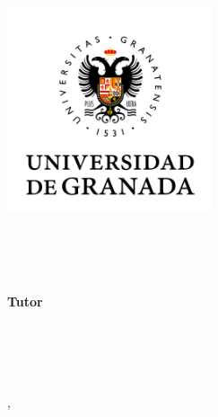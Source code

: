 \begin{titlepage}
    \begin{addmargin}[-3.45cm]{-3cm}
    \begin{center}
        \large  

        \hfill

        \includegraphics[width=6cm]{images/ugrmarca} \\ \medskip

        \vfill

        \begingroup
            \color{TealBlue}\spacedallcaps{\myTitle} \\ \bigskip
        \endgroup

        \spacedlowsmallcaps{\myName}

        \vfill

        \mySubtitle \\ 
        \myDegree \\ \medskip
        \textbf{Tutor} \\
        \myProf \\ \bigskip
        \spacedlowsmallcaps{\myFaculty} \\ \medskip
        \spacedlowsmallcaps{\myOtherFacultyA} \\
        \spacedlowsmallcaps{\myOtherFacultyB} \\ \bigskip

        \myLocation, \myTime %

        \vfill                      

    \end{center}  
  \end{addmargin}       
\end{titlepage}   